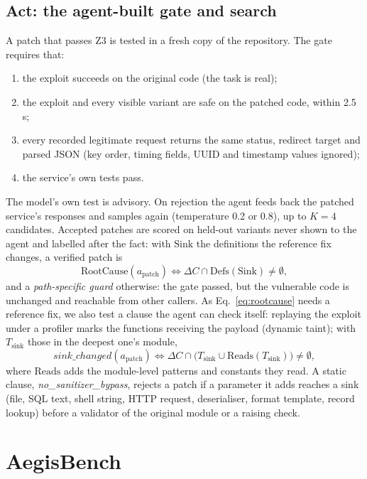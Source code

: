 \documentclass[journal]{IEEEtran}
\begin{document}
\subsection{Act: the agent-built gate and search}\label{sec:act}
A patch that passes Z3 is tested in a fresh copy of the repository. The gate requires that:
\begin{enumerate}
\item the exploit succeeds on the original code (the task is real);
\item the exploit and every visible variant are safe on the patched code, within 2.5\,s;
\item every recorded legitimate request returns the same status, redirect target and parsed JSON (key order, timing fields, UUID and timestamp values ignored);
\item the service's own tests pass.
\end{enumerate}
The model's own test is advisory. On rejection the agent feeds back the patched service's responses and samples again (temperature 0.2 or 0.8), up to $K = 4$ candidates. Accepted patches are scored on held-out variants never shown to the agent and labelled after the fact: with $\mathrm{Sink}$ the definitions the reference fix changes, a verified patch is
\begin{equation}
\mathrm{RootCause}(a_{\mathrm{patch}}) \iff \Delta C \cap \mathrm{Defs}(\mathrm{Sink}) \neq \emptyset,\label{eq:rootcause}
\end{equation}
and a \emph{path-specific guard} otherwise: the gate passed, but the vulnerable code is unchanged and reachable from other callers. As Eq.~\ref{eq:rootcause} needs a reference fix, we also test a clause the agent can check itself: replaying the exploit under a profiler marks the functions receiving the payload (dynamic taint); with $T_{\mathrm{sink}}$ those in the deepest one's module,
\begin{equation}
\mathit{sink\_changed}(a_{\mathrm{patch}}) \iff \Delta C \cap \big(T_{\mathrm{sink}} \cup \mathrm{Reads}(T_{\mathrm{sink}})\big) \neq \emptyset,\label{eq:taint}
\end{equation}
where $\mathrm{Reads}$ adds the module-level patterns and constants they read. A static clause, \emph{no\_sanitizer\_bypass}, rejects a patch if a parameter it adds reaches a sink (file, SQL text, shell string, HTTP request, deserialiser, format template, record lookup) before a validator of the original module or a raising check.

\section{AegisBench}\label{sec:bench}
\end{document}
